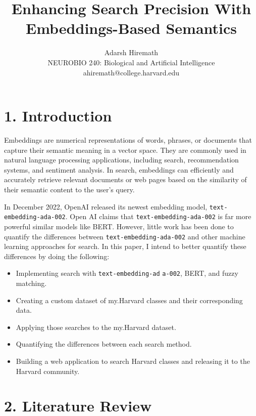 \documentclass[
	a4paper, %
	10pt, %
	unnumberedsections, %
	twoside, %
]{LTJournalArticle}
\title{Enhancing Search Precision With Embeddings-Based Semantics} %
\author{%
	Adarsh Hiremath \\
	NEUROBIO 240: Biological and Artificial Intelligence \\
	ahiremath@college.harvard.edu
}
\begin{document}
\maketitle %


\section{1. Introduction}

Embeddings are numerical representations of words, phrases, or documents that capture their semantic meaning in a vector space. They are commonly used in natural language processing applications, including search, recommendation systems, and sentiment analysis. In search, embeddings can efficiently and accurately retrieve relevant documents or web pages based on the similarity of their semantic content to the user's query.

In December 2022, OpenAI released its newest embedding model, \texttt{text-embedding-ada-002}. Open AI claims that \texttt{text-embedding-ada-002} is far more powerful similar models like BERT. However, little work has been done to quantify the differences between \texttt{text-embedding-ada-002} and other machine learning approaches for search. In this paper, I intend to better quantify these differences by doing the following: 
\begin{itemize}
	\item Implementing search with \texttt{text-embedding-ad}
	\texttt{a-002}, BERT, and fuzzy matching. 
	\item Creating a custom dataset of my.Harvard classes and their corresponding data.
	\item Applying those searches to the my.Harvard dataset.
	\item Quantifying the differences between each search method. 
	\item Building a web application to search Harvard classes and releasing it to the Harvard community. 
\end{itemize}

\section{2. Literature Review}
\end{document}
